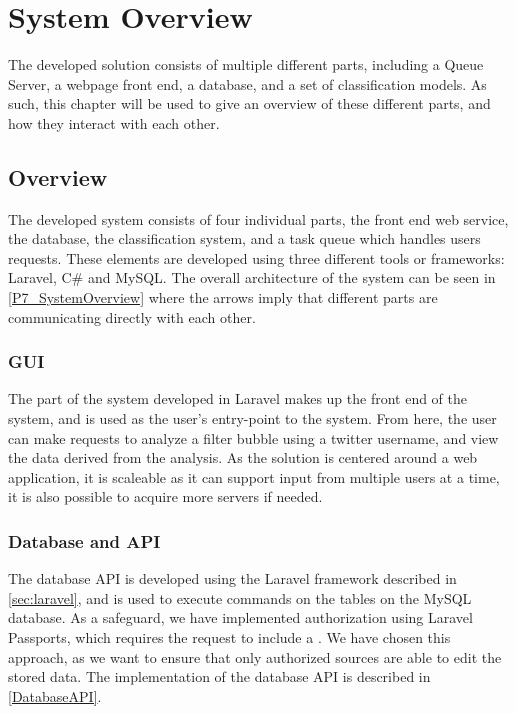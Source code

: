 \chapter{System Overview}\label{ch:sysview}  The developed solution
consists of multiple different parts, including a Queue Server, a webpage front
end, a database, and a set of classification models. As such, this chapter
will be used to give an overview of these different parts, and how they
interact with each other.

\section{Overview}
The developed system consists of four individual parts, the front end web
service, the database, the classification system, and a task queue which handles
users requests. These elements are developed using three different tools or
frameworks: Laravel, C\# and MySQL. The overall architecture of the
system can be seen in \autoref{P7_SystemOverview} where the arrows imply that
different parts are communicating directly with each other.
 

\subsection{GUI} %
The part of the system developed in Laravel makes up the front end of the
system, and is used as the user's entry-point to the system. From here, the
user can make requests to analyze a filter bubble using a twitter username, and
view the data derived from the analysis. As the solution is centered around a web
application, it is scaleable as it can support input from multiple users
at a time, it is also possible to acquire more servers if needed. 

\subsection{Database and API}
The database API is developed using the Laravel framework described in
\autoref{sec:laravel}, and is used to execute commands on the tables on the
MySQL database. As a safeguard, we have implemented authorization using Laravel
Passports, which requires the request to include a . We
have chosen this approach, as we want to ensure that only authorized sources are
able to edit the stored data. The implementation of the database API is
described in \autoref{DatabaseAPI}.

